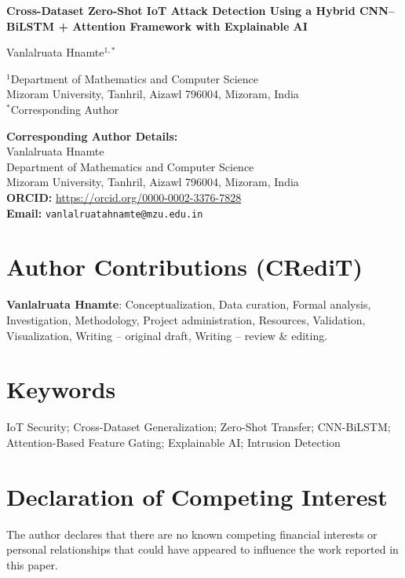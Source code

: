 \documentclass[12pt,a4paper]{article}
\begin{document}
\begin{center}

{\LARGE\bfseries{}
Cross-Dataset Zero-Shot IoT Attack Detection Using a Hybrid CNN--BiLSTM + Attention Framework with Explainable AI\par}

\vspace{1cm}

{\Large
Vanlalruata Hnamte$^{1,*}$
}

\vspace{0.5cm}

$^{1}$Department of Mathematics and Computer Science\\
Mizoram University, Tanhril, Aizawl 796004, Mizoram, India\\[0.3cm]
$^{*}$Corresponding Author

\vspace{1cm}

\textbf{Corresponding Author Details:}\\
Vanlalruata Hnamte\\
Department of Mathematics and Computer Science\\
Mizoram University, Tanhril, Aizawl 796004, Mizoram, India\\[0.2cm]
\textbf{ORCID:} \url{https://orcid.org/0000-0002-3376-7828}\\[0.1cm]
\textbf{Email:} \texttt{vanlalruatahnamte@mzu.edu.in}

\end{center}

\vspace{1cm}

\section*{Author Contributions (CRediT)}
\textbf{Vanlalruata Hnamte}: Conceptualization, Data curation, Formal analysis, Investigation, Methodology, Project administration, Resources, Validation, Visualization, Writing -- original draft, Writing -- review \& editing.

\section*{Keywords}
IoT Security; Cross-Dataset Generalization; Zero-Shot Transfer; CNN-BiLSTM; Attention-Based Feature Gating; Explainable AI; Intrusion Detection

\section*{Declaration of Competing Interest}
The author declares that there are no known competing financial interests or personal relationships that could have appeared to influence the work reported in this paper.
\end{document}
